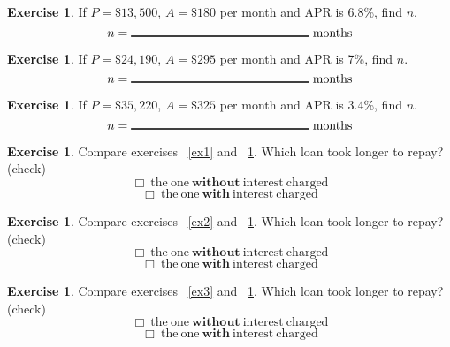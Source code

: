 \documentclass[12pt,letterpaper]{amsart}
\theoremstyle{definition} %
\newtheorem{xca}[theorem]{Exercise}
\begin{document}
\begin{xca}\label{ex4}If $P=\$13,500$, $A=\$180$ per month and APR is 6.8\%, find $n$.
\vspace{5ex}
$$n=\mathrm{\rule{2in}{1pt}\ months}$$\end{xca}

\begin{xca}\label{ex5}If $P=\$24,190$, $A=\$295$ per month and APR is 7\%, find $n$.
\vspace{5ex}
$$n=\mathrm{\rule{2in}{1pt}\ months}$$\end{xca}

\begin{xca}\label{ex6}If $P=\$35,220$, $A=\$325$ per month and APR is 3.4\%, find $n$.
\vspace{5ex}
$$n=\mathrm{\rule{2in}{1pt}\ months}$$\end{xca}

\vspace{2ex}

\begin{xca}\label{ex7}Compare exercises ~\ref{ex1} and ~\ref{ex4}. Which loan took longer to repay? (check)
$$\Box\mathrm{\ the\ one\ \textbf{without}\ interest\ charged}$$
$$\Box\mathrm{\ the\ one\ \textbf{with}\ interest\ charged}$$\end{xca}

\begin{xca}\label{ex8}Compare exercises ~\ref{ex2} and ~\ref{ex5}. Which loan took longer to repay? (check)
$$\Box\mathrm{\ the\ one\ \textbf{without}\ interest\ charged}$$
$$\Box\mathrm{\ the\ one\ \textbf{with}\ interest\ charged}$$\end{xca}

\begin{xca}\label{ex9}Compare exercises ~\ref{ex3} and ~\ref{ex6}. Which loan took longer to repay? (check)
$$\Box\mathrm{\ the\ one\ \textbf{without}\ interest\ charged}$$
$$\Box\mathrm{\ the\ one\ \textbf{with}\ interest\ charged}$$\end{xca}

\vspace{2ex}
\end{document}
